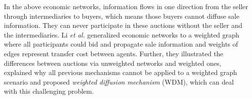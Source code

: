 \documentclass{article}
\begin{document}
In the above economic networks, information flows in one direction from the seller through intermediaries to buyers, which means those buyers cannot diffuse sale information. They can never participate in these auctions without the seller and the intermediaries. Li \emph{et al.}  generalized economic networks to a weighted graph where all participants could bid and propagate sale information and weights of edges represent transfer cost between agents. Further, they illustrated the differences between auctions via unweighted networks and weighted ones, explained why all previous mechanisms cannot be applied to a weighted graph scenario and proposed \emph{weighted diffusion mechanism} (WDM), which can deal with this challenging problem. 
\end{document}
